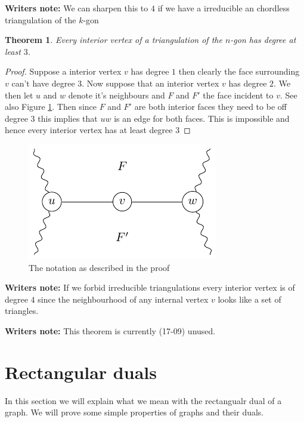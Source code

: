 \documentclass[a4paper]{article}
\newtheorem{thrm}{Theorem}
\theoremstyle{definition}
\newcommand{\scr}[1]{\mathcal{#1}}
\newcommand{\note}{\textbf{Writers note: }}
\begin{document}
\note We can sharpen this to $4$ if we have a irreducible an chordless triangulation of the $k$-gon

\begin{thrm} 
Every interior vertex of a triangulation of the $n$-gon has degree at least $3$.
\end{thrm}
\begin{proof}
Suppose a interior vertex $v$ has degree $1$ then clearly the face surrounding $v$ can't have degree $3$. Now suppose that an interior vertex $v$ has degree $2$. We then let $u$ and $w$ denote it's neighbours and $F$ and $F'$ the face incident to $v$. See also Figure \ref{fig:interiorVertexDegree3}. Then since $F$ and $F'$ are both interior faces they need to be off degree $3$ this implies that $uw$ is an edge for both faces. This is impossible and hence every interior vertex has at least degree $3$
\end{proof}

\begin{figure}[h!]
\centering
\includegraphics{img/interiorVertexDegree3.pdf}
\caption{The notation as described in the proof \label{fig:interiorVertexDegree3}
}
\end{figure}

\note If we forbid irreducible triangulations every interior vertex is of degree $4$ since the neighbourhood of any internal vertex $v$ looks like a set of triangles.

\note This theorem is currently (17-09) unused.




\section{Rectangular duals}

\newcommand{\G}{\scr G}
\renewcommand{\L}{\scr L}

In this section we will explain what we mean with the rectangualr dual of a graph. We will prove some simple properties of graphs and their duals.
\end{document}
